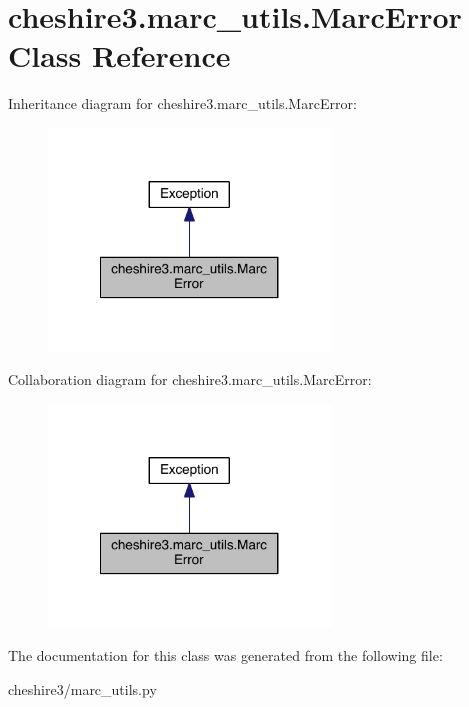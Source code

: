 \hypertarget{classcheshire3_1_1marc__utils_1_1_marc_error}{\section{cheshire3.\-marc\-\_\-utils.\-Marc\-Error Class Reference}
\label{classcheshire3_1_1marc__utils_1_1_marc_error}
}


Inheritance diagram for cheshire3.\-marc\-\_\-utils.\-Marc\-Error\-:
\nopagebreak
\begin{figure}[H]
\begin{center}
\leavevmode
\includegraphics[width=212pt]{classcheshire3_1_1marc__utils_1_1_marc_error__inherit__graph}
\end{center}
\end{figure}


Collaboration diagram for cheshire3.\-marc\-\_\-utils.\-Marc\-Error\-:
\nopagebreak
\begin{figure}[H]
\begin{center}
\leavevmode
\includegraphics[width=212pt]{classcheshire3_1_1marc__utils_1_1_marc_error__coll__graph}
\end{center}
\end{figure}


The documentation for this class was generated from the following file\-:\begin{DoxyCompactItemize}
\item 
cheshire3/marc\-\_\-utils.\-py\end{DoxyCompactItemize}
